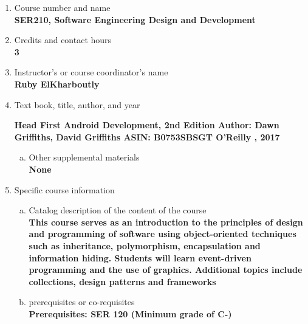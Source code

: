 \label{SER210}  %
\begin{enumerate}[1.]
\item Course number and name\\
  {\bfseries
    SER210, Software Engineering Design and Development
  }

\item Credits and contact hours\\
  {\bfseries
    3
  }

\item Instructor's or course coordinator's name\\
  {\bfseries
    Ruby ElKharboutly
  }

\item Text book, title, author, and year\\
  {\bfseries
	Head First Android Development, 2nd Edition
	Author: Dawn Griffiths, David Griffiths
	ASIN: B0753SBSGT
	O’Reilly , 2017

  }
\begin{enumerate}[a.]
\item Other supplemental materials\\
  {\bfseries
    None
  }
\end{enumerate}

\item Specific course information
\begin{enumerate}[a.]
\item Catalog description of the content of the course\\
  {\bfseries
    This course serves as an introduction to the principles of design and programming of software using object-oriented techniques such as inheritance, polymorphism, encapsulation and information hiding. Students will learn event-driven programming and the use of graphics. Additional topics include collections, design patterns and frameworks   }

\item prerequisites or co-requisites\\
  {\bfseries
    Prerequisites: SER 120 (Minimum grade of C-)
  }


\end{enumerate}
\end{enumerate}
